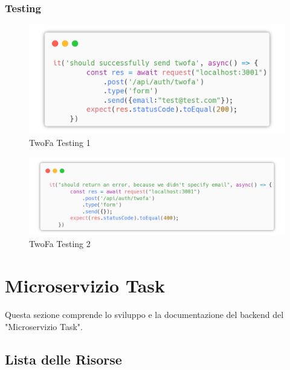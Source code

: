 \documentclass{report}
\begin{document}
\subsubsection*{Testing}
\begin{figure}[H]
	\centering\includegraphics[width=1\textwidth]{images/microservizio-autenticazione/tests/twofa_test_1.png}
	\caption{TwoFa Testing 1}
\end{figure}
\begin{figure}[H]
	\centering\includegraphics[width=1\textwidth]{images/microservizio-autenticazione/tests/twofa_test_2.png}
	\caption{TwoFa Testing 2}
\end{figure}
\section{Microservizio Task}

Questa sezione comprende lo sviluppo e la documentazione del backend del
"Microservizio Task". 

\subsection{Lista delle Risorse}
\end{document}
